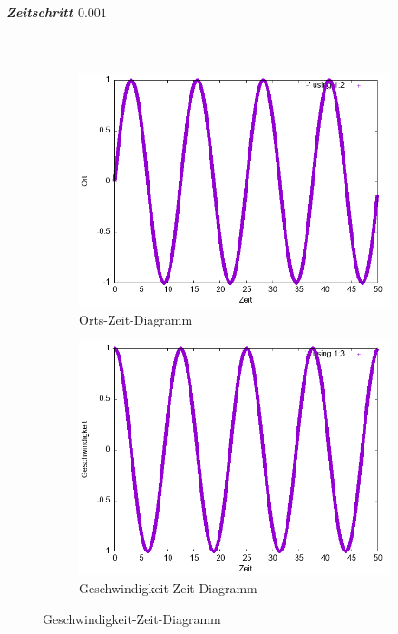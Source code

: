 \documentclass[
    oneside,
    ngerman,
    footinclude=false,
    captions=tableheading,
    DIV=12
]{scrartcl}
\begin{document}
            \subparagraph*{Zeitschritt $0.001$}\,
            \begin{figure}[H]
                \centering
                \begin{subfigure}[b]{0.45\textwidth}
                    \centering
                    \includegraphics[width=\textwidth]{Bilddateien/RK2A1(a)-0001-0-x.png}
                    \caption{Orts-Zeit-Diagramm}
                    \label{fig:RK2A1(a)-0001-0-x}
                \end{subfigure}
                \hfill
                \begin{subfigure}[b]{0.45\textwidth}
                    \centering
                    \includegraphics[width=\textwidth]{Bilddateien/RK2A1(a)-0001-0-v.png}
                    \caption{Geschwindigkeit-Zeit-Diagramm}
                    \label{fig:RK2A1(a)-0001-0-v}
                \end{subfigure}
            \end{figure}
        
\end{document}
